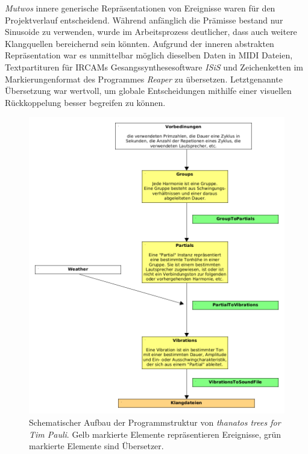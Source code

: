 \documentclass[12pt,a4paper,ngerman]{article}
\begin{document}
\bigskip

\emph{Mutwos} innere generische Repräsentationen von Ereignisse waren für den Projektverlauf entscheidend.
Während anfänglich die Prämisse bestand nur Sinusoide zu verwenden, wurde im Arbeitsprozess deutlicher, dass auch weitere Klangquellen bereichernd sein könnten.
Aufgrund der inneren abstrakten Repräsentation war es unmittelbar möglich dieselben Daten in MIDI Dateien, Textpartituren für IRCAMs Gesangssynthesesoftware \emph{ISiS} und Zeichenketten im Markierungenformat des Programmes \emph{Reaper} zu übersetzen.
Letztgenannte Übersetzung war wertvoll, um globale Entscheidungen mithilfe einer visuellen Rückkoppelung besser begreifen zu können.

\begin{figure}[h!]
    \begin{center}
        \includegraphics[scale=0.5]{pictures/thantostrees-for-timpauli-mutwo-structure.png}
    \end{center}
    \caption{%
        Schematischer Aufbau der Programmstruktur von \emph{thanatos trees for Tim Pauli}.
        Gelb markierte Elemente repräsentieren Ereignisse, grün markierte Elemente sind Übersetzer.
    }
    \label{fig:thanatosMutwoStructure}
\end{figure}
\end{document}
